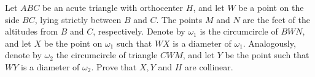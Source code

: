 Let 
$ABC$
 be an acute triangle with orthocenter 
$H$, 
 and let 
$W$
 be a point on the side 
$BC$, 
 lying strictly between 
$B$
 and 
$C$.
 The points 
$M$
 and 
$N$
 are the feet of the altitudes from 
$B$
 and 
$C$, 
 respectively. Denote by 
$\omega_1$
 is the circumcircle of 
$BWN$, 
 and let 
$X$
 be the point on 
$\omega_1$
 such that 
$WX$
 is a diameter of 
$\omega_1$.
 Analogously, denote by 
$\omega_2$
 the circumcircle of triangle 
$CWM$, 
 and let 
$Y$
 be the point such that 
$WY$
 is a diameter of 
$\omega_2$.
 Prove that 
$X,Y$
 and 
$H$
 are collinear.
